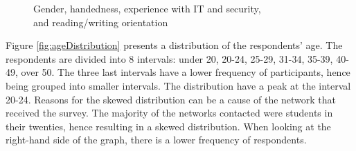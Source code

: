     \begin{figure}[H]
      \centering
      \captionsetup{justification=centering}
      \hspace{0.5cm}
      \caption{Gender, handedness, experience with IT and security,\\ and reading/writing orientation}
      \label{fig:respondentsBasics}
    \end{figure}

    Figure \ref{fig:ageDistribution} presents a distribution of the respondents' age. The respondents are divided into 8 intervals: under 20, 20-24, 25-29, 31-34, 35-39, 40-49, over 50. The three last intervals have a lower frequency of participants, hence being grouped into smaller intervals. The distribution have a peak at the interval 20-24. Reasons for the skewed distribution can be a cause of the network that received the survey. The majority of the networks contacted were students in their twenties, hence resulting in a skewed distribution. When looking at the right-hand side of the graph, there is a lower frequency of respondents. 

